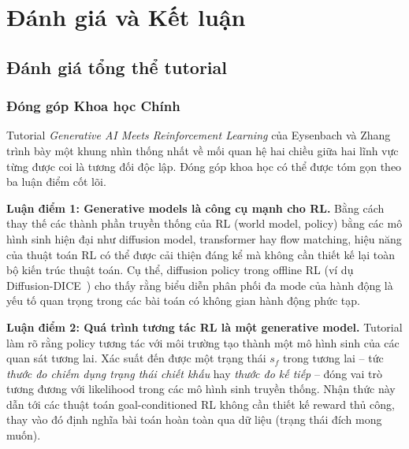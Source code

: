 
\section{Đánh giá và Kết luận}

\subsection{Đánh giá tổng thể tutorial}

\subsubsection{Đóng góp Khoa học Chính}

Tutorial \textit{Generative AI Meets Reinforcement Learning} của Eysenbach và Zhang~\cite{eysenbach2025generativerl} trình bày
một khung nhìn thống nhất về mối quan hệ hai chiều giữa hai lĩnh vực từng được coi là tương đối độc lập.
Đóng góp khoa học có thể được tóm gọn theo ba luận điểm cốt lõi.

\textbf{Luận điểm 1: Generative models là công cụ mạnh cho RL.}
Bằng cách thay thế các thành phần truyền thống của RL (world model, policy) bằng các mô hình sinh hiện đại như
diffusion model, transformer hay flow matching, hiệu năng của thuật toán RL có thể được cải thiện đáng kể mà
không cần thiết kế lại toàn bộ kiến trúc thuật toán.
Cụ thể, diffusion policy trong offline RL (ví dụ Diffusion-DICE~\cite{mao2024diffusiondice}) cho thấy rằng biểu diễn
phân phối đa mode của hành động là yếu tố quan trọng trong các bài toán có không gian hành động phức tạp.

\textbf{Luận điểm 2: Quá trình tương tác RL là một generative model.}
Tutorial làm rõ rằng policy tương tác với môi trường tạo thành một mô hình sinh của các quan sát tương lai.
Xác suất đến được một trạng thái $s_f$ trong tương lai -- tức \textit{thước đo chiếm dụng trạng thái chiết khấu} hay
\textit{thước đo kế tiếp} -- đóng vai trò tương đương với likelihood trong các mô hình sinh truyền thống.
Nhận thức này dẫn tới các thuật toán goal-conditioned RL không cần thiết kế reward thủ công, thay vào đó
định nghĩa bài toán hoàn toàn qua dữ liệu (trạng thái đích mong muốn).

